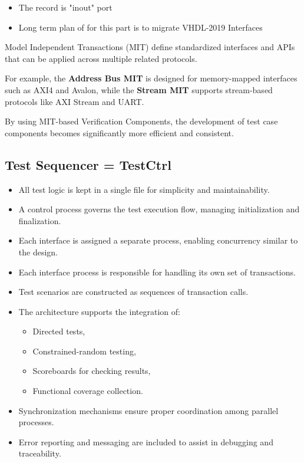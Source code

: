 \documentclass{article}
\begin{document}
\begin{itemize}
    \item The record is "inout" port
    \item Long term plan of for this part is to migrate VHDL-2019 Interfaces
\end{itemize}

Model Independent Transactions (MIT) define standardized interfaces and APIs that can be applied across multiple related protocols. 

For example, the \textbf{Address Bus MIT} is designed for memory-mapped interfaces such as AXI4 and Avalon, while the \textbf{Stream MIT} supports stream-based protocols like AXI Stream and UART. 

By using MIT-based Verification Components, the development of test case components becomes significantly more efficient and consistent.


\subsection{Test Sequencer = TestCtrl}

\begin{itemize}
  \item All test logic is kept in a single file for simplicity and maintainability.
  \item A control process governs the test execution flow, managing initialization and finalization.
  \item Each interface is assigned a separate process, enabling concurrency similar to the design.
  \item Each interface process is responsible for handling its own set of transactions.
  \item Test scenarios are constructed as sequences of transaction calls.
  \item The architecture supports the integration of:
  \begin{itemize}
    \item Directed tests,
    \item Constrained-random testing,
    \item Scoreboards for checking results,
    \item Functional coverage collection.
  \end{itemize}
  \item Synchronization mechanisms ensure proper coordination among parallel processes.
  \item Error reporting and messaging are included to assist in debugging and traceability.
\end{itemize}
\end{document}
